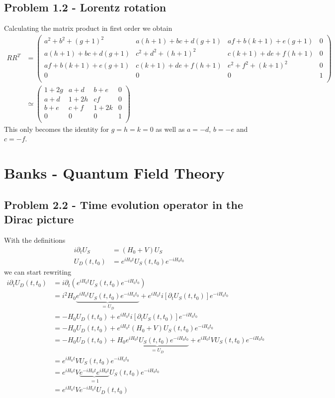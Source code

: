 \documentclass[../main.tex]{subfiles}
\begin{document}
\subsection{Problem 1.2 - Lorentz rotation}
Calculating the matrix product in first order we obtain
\begin{align}
R R^T&=\left(
\begin{array}{cccc}
 a^2+b^2+(g+1)^2 & a (h+1)+b c+d (g+1) & a f+b (k+1)+e (g+1) & 0 \\
 a (h+1)+b c+d (g+1) & c^2+d^2+(h+1)^2 & c (k+1)+d e+f (h+1) & 0 \\
 a f+b (k+1)+e (g+1) & c (k+1)+d e+f (h+1) & e^2+f^2+(k+1)^2 & 0 \\
 0 & 0 & 0 & 1 \\
\end{array}
\right)\\
&\simeq
\left(
\begin{array}{cccc}
 1+2g & a+d & b+e & 0 \\
 a+d & 1+2h & cf & 0 \\
 b+e & c+f & 1+2k & 0 \\
 0 & 0 & 0 & 1 \\
\end{array}
\right)
\end{align}
This only becomes the identity for $g=h=k=0$ as well as $a=-d$, $b=-e$ and $c=-f$.



\newpage
\section{{\sc Banks} - Quantum Field Theory}
\subsection{Problem 2.2 - Time evolution operator in the Dirac picture}
With the definitions
\begin{align}
i\partial_tU_S&=(H_0+V)U_S\\
U_D(t,t_0)&=e^{iH_0t}U_S(t,t_0)e^{-iH_0t_0}
\end{align}
we can start rewriting
\begin{align}
i\partial_t U_D(t,t_0)
&=i\partial_t \left(e^{iH_0t}U_S(t,t_0)e^{-iH_0t_0}\right)\\
&=i^2H_0\underbrace{e^{iH_0t}U_S(t,t_0)e^{-iH_0t_0}}_{=U_D}+e^{iH_0t}i[\partial_tU_S(t,t_0)]e^{-iH_0t_0}\\
&=-H_0 U_D(t,t_0)+e^{iH_0t}i[\partial_tU_S(t,t_0)]e^{-iH_0t_0}\\
&=-H_0 U_D(t,t_0)+e^{iH_0t}(H_0+V)U_S(t,t_0)e^{-iH_0t_0}\\
&=-H_0 U_D(t,t_0)+H_0\underbrace{e^{iH_0t}U_S(t,t_0)e^{-iH_0t_0}}_{=U_D}+e^{iH_0t}VU_S(t,t_0)e^{-iH_0t_0}\\
&=e^{iH_0t}VU_S(t,t_0)e^{-iH_0t_0}\\
&=e^{iH_0t}V\underbrace{e^{-iH_0t}e^{iH_0t}}_{=1}U_S(t,t_0)e^{-iH_0t_0}\\
&=e^{iH_0t}Ve^{-iH_0t}U_D(t,t_0)
\end{align}
\end{document}
